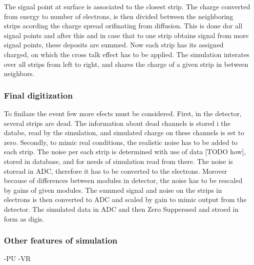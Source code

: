
The signal point at surface is associated to the closest strip. The charge converted from energy to number of electrons, is then divided between the neighboring strips acording the charge spread orifinating from diffusion. This is done dor all signal points and after this and in case that to one strip obtains signal from more signal points, these deposits are summed. Now each strip has its assigned charged, on which the cross talk effect has to be applied. The simulation interates over all strips from left to right, and shares the charge of a given strip in between neighbors.

\subsubsection{Final digitization}

To finilaze the event few more efects must be considered. First, in the detector, several strips are dead. The information about dead channels is stored i  the databe, read by the simulation, and simulated charge on these channels is set to zero. Secondly, to mimic real conditions, the realistic noise has to be added to each strip. The noise per each strip is determined with use of data [TODO how], stored in database, and for needs of simulation read from there. The noise is storead in ADC, therefore it has to be converted to the electrons. Morover because of differences between modules in detector, the noise has to be rescaled by gains of given modules. The summed signal and noise on the strips in electrons is then converted to ADC and scaled by gain to mimic output from the detector. The simulated data in ADC and then Zero Supperssed and stroed in form as digis. 
 
 

\subsubsection{Other features of simulation}
-PU
-VR

